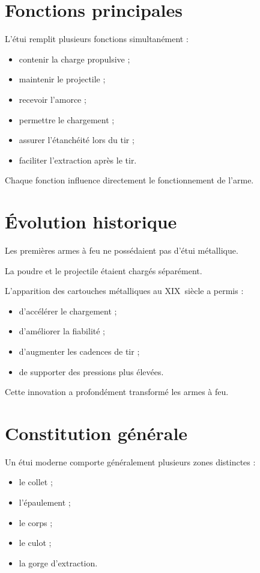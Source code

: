 \section{Fonctions principales}

L'étui remplit plusieurs fonctions simultanément :

\begin{itemize}
    \item contenir la charge propulsive ;
    \item maintenir le projectile ;
    \item recevoir l'amorce ;
    \item permettre le chargement ;
    \item assurer l'étanchéité lors du tir ;
    \item faciliter l'extraction après le tir.
\end{itemize}

Chaque fonction influence directement le fonctionnement de l'arme.

\section{Évolution historique}

Les premières armes à feu ne possédaient pas d'étui métallique.

La poudre et le projectile étaient chargés séparément.

L'apparition des cartouches métalliques au XIX\ieme\ siècle a permis :

\begin{itemize}
    \item d'accélérer le chargement ;
    \item d'améliorer la fiabilité ;
    \item d'augmenter les cadences de tir ;
    \item de supporter des pressions plus élevées.
\end{itemize}

Cette innovation a profondément transformé les armes à feu.

\section{Constitution générale}

Un étui moderne comporte généralement plusieurs zones distinctes :

\begin{itemize}
    \item le collet ;
    \item l'épaulement ;
    \item le corps ;
    \item le culot ;
    \item la gorge d'extraction.
\end{itemize}

